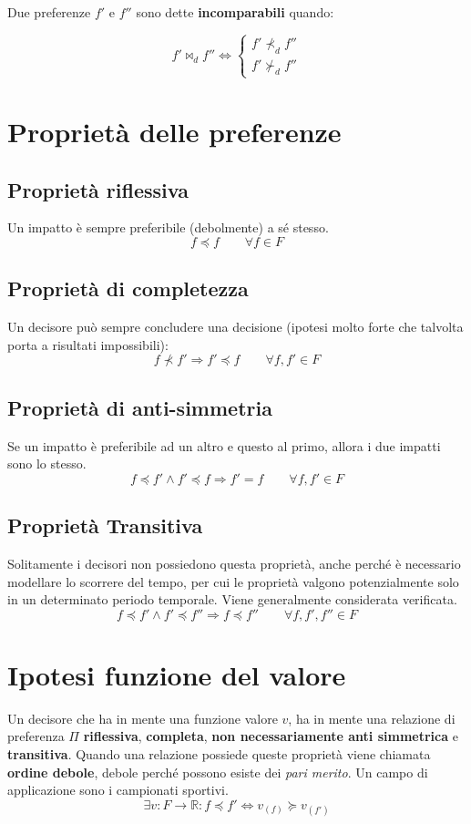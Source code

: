 \documentclass[\main/main.tex]{subfiles}
\begin{document}
\begin{definition}[Incomparabilità]
	Due preferenze $f'$ e $f''$ sono dette \textbf{incomparabili} quando:

	\[
		f' \Join_d f'' \Leftrightarrow
		\begin{cases}
			f' \nprec_d f'' \\
			f' \nsucc_d f''
		\end{cases}
	\]
\end{definition}


\section{Proprietà delle preferenze}
\subsection{Proprietà riflessiva}
Un impatto è sempre preferibile (debolmente) a sé stesso.
\[
	f \preccurlyeq f \qquad \forall f \in F
\]

\subsection{Proprietà di completezza}
Un decisore può sempre concludere una decisione (ipotesi molto forte che talvolta porta a risultati impossibili):
\[
	f \nprec f' \Rightarrow f' \preccurlyeq f \qquad \forall f, f' \in F
\]

\subsection{Proprietà di anti-simmetria}
Se un impatto è preferibile ad un altro e questo al primo, allora i due impatti sono lo stesso.
\[
	f \preccurlyeq f' \wedge f' \preccurlyeq f \Rightarrow f' = f \qquad \forall f, f' \in F
\]

\subsection{Proprietà Transitiva}
Solitamente i decisori non possiedono questa proprietà, anche perché è necessario modellare lo scorrere del tempo, per cui le proprietà valgono potenzialmente solo in un determinato periodo temporale. Viene generalmente considerata verificata.
\[
	f \preccurlyeq f' \wedge f' \preccurlyeq f'' \Rightarrow f \preccurlyeq f'' \qquad \forall f, f', f'' \in F
\]

\section{Ipotesi funzione del valore}
Un decisore che ha in mente una funzione valore $v$, ha in mente una relazione di preferenza $\Pi$ \textbf{riflessiva}, \textbf{completa}, \textbf{non necessariamente anti simmetrica} e \textbf{transitiva}. Quando una relazione possiede queste proprietà viene chiamata \textbf{ordine debole}, debole perché possono esiste dei \textit{pari merito}. Un campo di applicazione sono i campionati sportivi.
\[
	\exists v: F\rightarrow \mathbb{R}: f \preccurlyeq f' \Leftrightarrow v_{(f)} \succcurlyeq v_{(f')}
\]
\end{document}
